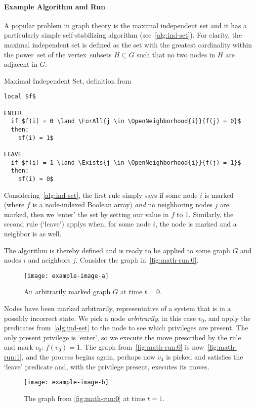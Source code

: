 \paragraph{Example Algorithm and Run}
A popular problem in graph theory is  \Dash
  the maximal independent set \Dash
  and it has a particularly simple self-stabilizing algorithm (see~\autoref{alg:ind-set}).
For clarity, the maximal independent set is defined as the set with the greatest cardinality
  within the power~set of the vertex~subsets $H \subseteq G$ such that
  no two nodes in $H$ are adjacent in $G$.

\begin{algorithm}[float]
  \caption{Maximal Independent Set, definition from \autocite{goddard:ssa--k-distance}}
  \label{alg:ind-set}
\begin{lstlisting}[language=ssa]
local $f$

ENTER
  if $f(i) = 0 \land \ForAll{j \in \OpenNeighborhood{i}}{f(j) = 0}$
  then:
    $f(i) = 1$

LEAVE
  if $f(i) = 1 \land \Exists{j \in \OpenNeighborhood{i}}{f(j) = 1}$
  then:
    $f(i) = 0$
\end{lstlisting}
\end{algorithm}

Considering~\autoref{alg:ind-set},
  the first rule simply says if some node $i$ is marked
  (where $f$ is a node-indexed Boolean array)
  \emph{and} no neighboring nodes $j$ are marked,
  then we \enquote*{enter} the set by setting our value in $f$ to 1.
Similarly, the second rule (\enquote*{leave})
  applys when, for some node $i$, the node is marked and a neighbor is as well.

The algorithm is thereby defined and is ready to be applied to
  some graph $G$ and nodes $i$ and neighbors $j$.
Consider the graph in~\autoref{fig:math-run:0}.
\begin{figure}
  \centering
  \texttt{[image: example-image-a]}
  \caption{An arbitrarily marked graph $G$ at time $t = 0$.}
  \label{fig:math-run:0}
\end{figure}
Nodes have been marked arbitrarily,
  representative of a system that is in a possibly incorrect state.
We pick a node \emph{arbitrarily}, in this case $v_0$,
  and apply the predicates from~\autoref{alg:ind-set} to the node
  to see which privileges are present.
The only present privilege is \enquote*{enter},
  so we execute the move prescribed by the rule and mark $v_0$: $f(v_0)=1$.
The graph from~\autoref{fig:math-run:0} is now~\autoref{fig:math-run:1},
  and the process begins again, perhaps now $v_4$ is picked and
  satisfies the \enquote*{leave} predicate and, with the privilege present,
  executes its moves.
\begin{figure}
  \centering
  \texttt{[image: example-image-b]}
  \caption{The graph from \autoref{fig:math-run:0} at time $t = 1$.}
  \label{fig:math-run:1}
\end{figure}


